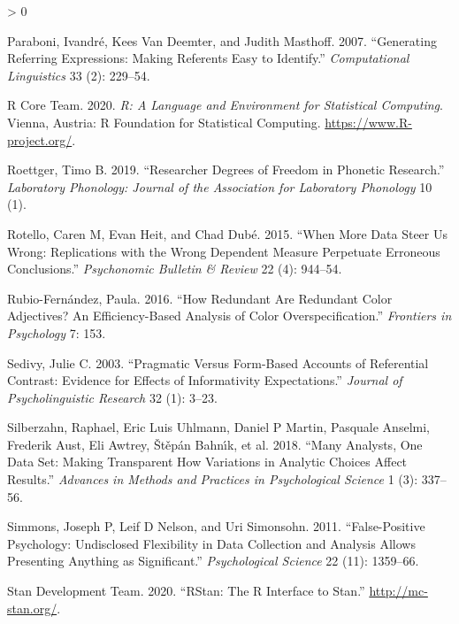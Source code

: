 \documentclass[
  12pt,
]{article}
\newlength{\cslhangindent}
\newenvironment{CSLReferences}[2] %
 {%
  \setlength{\parindent}{0pt}
  \ifodd #1 \everypar{\setlength{\hangindent}{\cslhangindent}}\ignorespaces\fi
  \ifnum #2 > 0
  \setlength{\parskip}{#2\baselineskip}
  \fi
 }%
 {}
\begin{document}
\begin{CSLReferences}{1}{0}
\leavevmode\hypertarget{ref-paraboni2007generating}{}%
Paraboni, Ivandré, Kees Van Deemter, and Judith Masthoff. 2007. {``Generating Referring Expressions: Making Referents Easy to Identify.''} \emph{Computational Linguistics} 33 (2): 229--54.

\leavevmode\hypertarget{ref-R-base}{}%
R Core Team. 2020. \emph{R: A Language and Environment for Statistical Computing}. Vienna, Austria: R Foundation for Statistical Computing. \url{https://www.R-project.org/}.

\leavevmode\hypertarget{ref-roettger2019researcher}{}%
Roettger, Timo B. 2019. {``Researcher Degrees of Freedom in Phonetic Research.''} \emph{Laboratory Phonology: Journal of the Association for Laboratory Phonology} 10 (1).

\leavevmode\hypertarget{ref-rotello2015more}{}%
Rotello, Caren M, Evan Heit, and Chad Dubé. 2015. {``When More Data Steer Us Wrong: {R}eplications with the Wrong Dependent Measure Perpetuate Erroneous Conclusions.''} \emph{Psychonomic Bulletin \& Review} 22 (4): 944--54.

\leavevmode\hypertarget{ref-rubio2016redundant}{}%
Rubio-Fernández, Paula. 2016. {``How Redundant Are Redundant Color Adjectives? An Efficiency-Based Analysis of Color Overspecification.''} \emph{Frontiers in Psychology} 7: 153.

\leavevmode\hypertarget{ref-sedivy2003pragmatic}{}%
Sedivy, Julie C. 2003. {``Pragmatic Versus Form-Based Accounts of Referential Contrast: Evidence for Effects of Informativity Expectations.''} \emph{Journal of Psycholinguistic Research} 32 (1): 3--23.

\leavevmode\hypertarget{ref-silberzahn2018many}{}%
Silberzahn, Raphael, Eric Luis Uhlmann, Daniel P Martin, Pasquale Anselmi, Frederik Aust, Eli Awtrey, Štěpán Bahnı́k, et al. 2018. {``Many Analysts, One Data Set: Making Transparent How Variations in Analytic Choices Affect Results.''} \emph{Advances in Methods and Practices in Psychological Science} 1 (3): 337--56.

\leavevmode\hypertarget{ref-simmons2011false}{}%
Simmons, Joseph P, Leif D Nelson, and Uri Simonsohn. 2011. {``False-Positive Psychology: Undisclosed Flexibility in Data Collection and Analysis Allows Presenting Anything as Significant.''} \emph{Psychological Science} 22 (11): 1359--66.

\leavevmode\hypertarget{ref-stan2020a}{}%
Stan Development Team. 2020. {``{RStan}: The {R} Interface to {Stan}.''} \url{http://mc-stan.org/}.


\end{CSLReferences}
\end{document}
